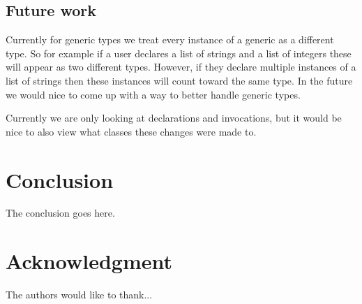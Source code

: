 \documentclass[conference]{IEEEtran}
\begin{document}
\subsection{Future work}

Currently for generic types we treat every instance of a generic as a different type. So for example if a user declares a list of strings and a list of integers these will appear as two different types. However, if they declare multiple instances of a list of strings then these instances will count toward the same type. In the future we would nice to come up with a way to better handle generic types.

Currently we are only looking at declarations and invocations, but it would be nice to also view what classes these changes were made to.

\section{Conclusion}
The conclusion goes here.






\section*{Acknowledgment}


The authors would like to thank...












\end{document}
